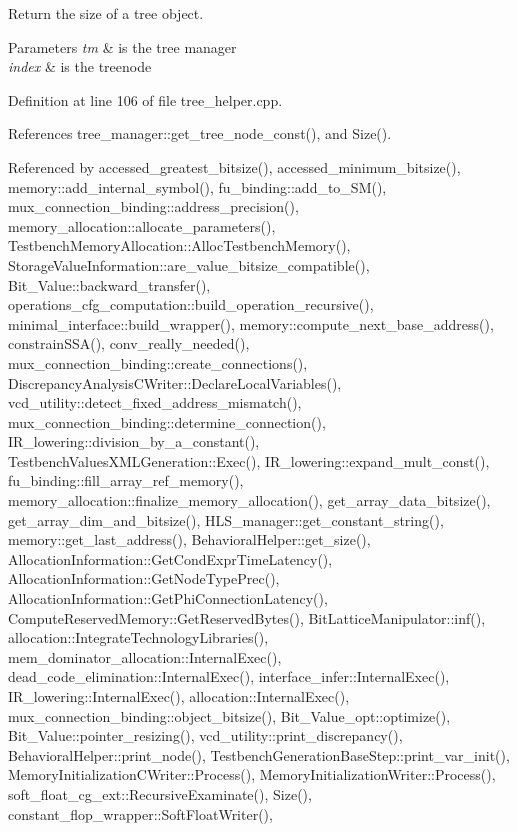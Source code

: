 Return the size of a tree object. 


\begin{DoxyParams}{Parameters}
{\em tm} & is the tree manager \\
\hline
{\em index} & is the treenode \\
\hline
\end{DoxyParams}


Definition at line 106 of file tree\+\_\+helper.\+cpp.



References tree\+\_\+manager\+::get\+\_\+tree\+\_\+node\+\_\+const(), and Size().



Referenced by accessed\+\_\+greatest\+\_\+bitsize(), accessed\+\_\+minimum\+\_\+bitsize(), memory\+::add\+\_\+internal\+\_\+symbol(), fu\+\_\+binding\+::add\+\_\+to\+\_\+\+S\+M(), mux\+\_\+connection\+\_\+binding\+::address\+\_\+precision(), memory\+\_\+allocation\+::allocate\+\_\+parameters(), Testbench\+Memory\+Allocation\+::\+Alloc\+Testbench\+Memory(), Storage\+Value\+Information\+::are\+\_\+value\+\_\+bitsize\+\_\+compatible(), Bit\+\_\+\+Value\+::backward\+\_\+transfer(), operations\+\_\+cfg\+\_\+computation\+::build\+\_\+operation\+\_\+recursive(), minimal\+\_\+interface\+::build\+\_\+wrapper(), memory\+::compute\+\_\+next\+\_\+base\+\_\+address(), constrain\+S\+S\+A(), conv\+\_\+really\+\_\+needed(), mux\+\_\+connection\+\_\+binding\+::create\+\_\+connections(), Discrepancy\+Analysis\+C\+Writer\+::\+Declare\+Local\+Variables(), vcd\+\_\+utility\+::detect\+\_\+fixed\+\_\+address\+\_\+mismatch(), mux\+\_\+connection\+\_\+binding\+::determine\+\_\+connection(), I\+R\+\_\+lowering\+::division\+\_\+by\+\_\+a\+\_\+constant(), Testbench\+Values\+X\+M\+L\+Generation\+::\+Exec(), I\+R\+\_\+lowering\+::expand\+\_\+mult\+\_\+const(), fu\+\_\+binding\+::fill\+\_\+array\+\_\+ref\+\_\+memory(), memory\+\_\+allocation\+::finalize\+\_\+memory\+\_\+allocation(), get\+\_\+array\+\_\+data\+\_\+bitsize(), get\+\_\+array\+\_\+dim\+\_\+and\+\_\+bitsize(), H\+L\+S\+\_\+manager\+::get\+\_\+constant\+\_\+string(), memory\+::get\+\_\+last\+\_\+address(), Behavioral\+Helper\+::get\+\_\+size(), Allocation\+Information\+::\+Get\+Cond\+Expr\+Time\+Latency(), Allocation\+Information\+::\+Get\+Node\+Type\+Prec(), Allocation\+Information\+::\+Get\+Phi\+Connection\+Latency(), Compute\+Reserved\+Memory\+::\+Get\+Reserved\+Bytes(), Bit\+Lattice\+Manipulator\+::inf(), allocation\+::\+Integrate\+Technology\+Libraries(), mem\+\_\+dominator\+\_\+allocation\+::\+Internal\+Exec(), dead\+\_\+code\+\_\+elimination\+::\+Internal\+Exec(), interface\+\_\+infer\+::\+Internal\+Exec(), I\+R\+\_\+lowering\+::\+Internal\+Exec(), allocation\+::\+Internal\+Exec(), mux\+\_\+connection\+\_\+binding\+::object\+\_\+bitsize(), Bit\+\_\+\+Value\+\_\+opt\+::optimize(), Bit\+\_\+\+Value\+::pointer\+\_\+resizing(), vcd\+\_\+utility\+::print\+\_\+discrepancy(), Behavioral\+Helper\+::print\+\_\+node(), Testbench\+Generation\+Base\+Step\+::print\+\_\+var\+\_\+init(), Memory\+Initialization\+C\+Writer\+::\+Process(), Memory\+Initialization\+Writer\+::\+Process(), soft\+\_\+float\+\_\+cg\+\_\+ext\+::\+Recursive\+Examinate(), Size(), constant\+\_\+flop\+\_\+wrapper\+::\+Soft\+Float\+Writer(), 